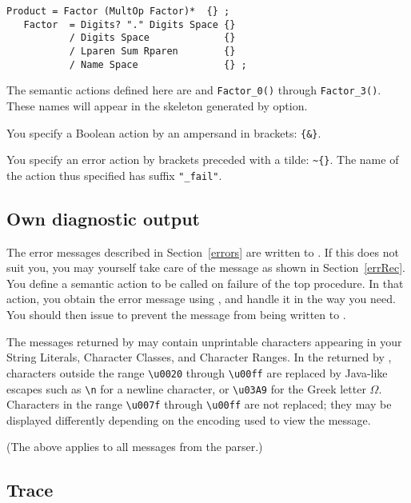 \small
\begin{Verbatim}[frame=single,framesep=2mm,samepage=true,xleftmargin=15mm,xrightmargin=15mm,baselinestretch=0.8]
   Product = Factor (MultOp Factor)*  {} ;
   Factor  = Digits? "." Digits Space {}
           / Digits Space             {}
           / Lparen Sum Rparen        {} 
           / Name Space               {} ; 
\end{Verbatim}
\normalsize

The semantic actions defined here are
 and \verb#Factor_0()# through \verb#Factor_3()#.
These names will appear in the skeleton generated by  option.

You specify a Boolean action by an ampersand in brackets: \verb#{&}#.

You specify an error action by brackets preceded with a tilde: \verb#~{}#.\newline
The name of the action thus specified has suffix \verb#"_fail"#.


\subsection{Own diagnostic output}

The error messages described in Section~\ref{errors}
are written to .
If this does not suit you, you may yourself take care of the message
as shown in Section~\ref{errRec}.
You define a semantic action to be called on failure of the top procedure.
In that action, you obtain the error message using ,
and handle it in the way you need.
You should then issue  to prevent the message from
being written to .

The messages returned by  may contain unprintable
characters appearing in your String Literals, Character Classes, and Character Ranges.
In the  returned by ,
characters outside the range \verb#\u0020# through \verb#\u00ff#
are replaced by Java-like
escapes such as \verb#\n# for a newline character, 
or \verb#\u03A9# for the Greek letter $\Omega$.
Characters in the range \verb#\u007f# through \verb#\u00ff# are not replaced;
they may be displayed differently depending on the encoding used to view the message.

(The above applies to all messages from the parser.)


\subsection{Trace}

